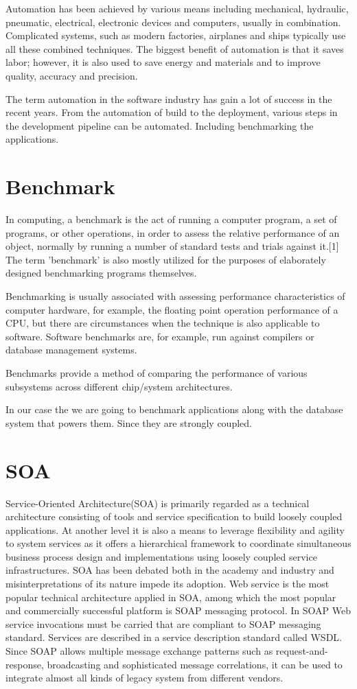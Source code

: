 Automation has been achieved by various means including mechanical, hydraulic,
pneumatic, electrical, electronic devices and computers, usually in combination.
Complicated systems, such as modern factories, airplanes and ships typically use
all these combined techniques. The biggest benefit of automation is that it
saves labor; however, it is also used to save energy and materials and to
improve quality, accuracy and precision.

The term automation in the software industry has gain a lot of success in the
recent years. From the automation of build to the deployment, various steps
in the development pipeline can be automated. Including benchmarking the
applications.

\section{Benchmark}
In computing, a benchmark is the act of running a computer program, a set of
programs, or other operations, in order to assess the relative performance of an
object, normally by running a number of standard tests and trials against it.[1]
The term 'benchmark' is also mostly utilized for the purposes of elaborately
designed benchmarking programs themselves.

Benchmarking is usually associated with assessing performance characteristics of
computer hardware, for example, the floating point operation performance of a
CPU, but there are circumstances when the technique is also applicable to
software. Software benchmarks are, for example, run against compilers or
database management systems.

Benchmarks provide a method of comparing the performance of various subsystems
across different chip/system architectures.

In our case the we are going to benchmark applications along with the database
system that powers them. Since they are strongly coupled.

\section{SOA}
Service-Oriented Architecture(SOA) is primarily regarded as a technical
architecture consisting of tools and service specification to build loosely
coupled applications. At another level it is also a means to leverage
flexibility and agility to system services as it offers a hierarchical framework
to coordinate simultaneous business process design and implementations using
loosely coupled service infrastructures. SOA has been debated both in the
academy and industry and misinterpretations of its nature impede its adoption.
Web service is the most popular technical architecture applied in SOA, among
which the most popular and commercially successful platform is SOAP messaging
protocol. In SOAP Web service invocations must be carried that are compliant to
SOAP messaging standard. Services are described in a service description
standard called WSDL. Since SOAP allows multiple message exchange patterns such
as request-and-response, broadcasting and sophisticated message correlations, it
can be used to integrate almost all kinds of legacy system from different
vendors.\cite{soa}

